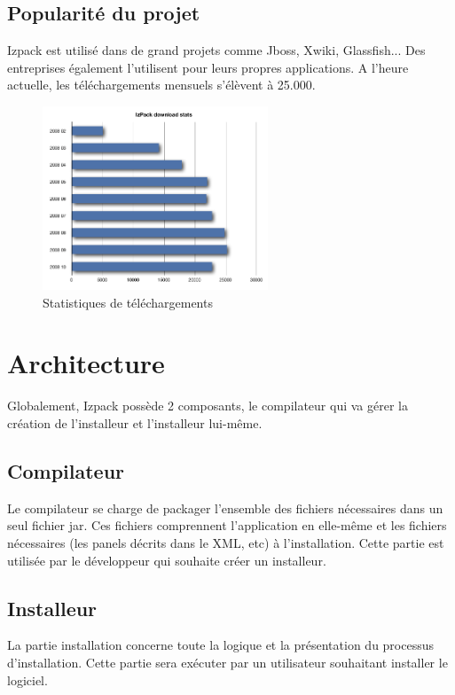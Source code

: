 \subsection{Popularité du projet}
Izpack est utilisé dans de grand projets comme Jboss, Xwiki, Glassfish... Des entreprises également l'utilisent pour leurs propres applications. A l'heure actuelle, les téléchargements mensuels s'élèvent à 25.000.
\begin{figure}[H]
	\centering
	\includegraphics[width=0.6\textwidth]{../image/telechargements.png}
	\caption{Statistiques de téléchargements}
\end{figure}
\section{Architecture}
Globalement, Izpack possède 2 composants, le compilateur qui va gérer la création de l'installeur et l'installeur lui-même.

\subsection{Compilateur}
Le compilateur se charge de packager l'ensemble des fichiers nécessaires dans un seul fichier jar.
Ces fichiers comprennent l'application en elle-même et les fichiers nécessaires (les panels décrits dans le XML, etc) à l'installation.
Cette partie est utilisée par le développeur qui souhaite créer un installeur.

\subsection{Installeur}
La partie installation concerne toute la logique et la présentation du processus d'installation. Cette partie sera exécuter par un utilisateur souhaitant installer le logiciel.

